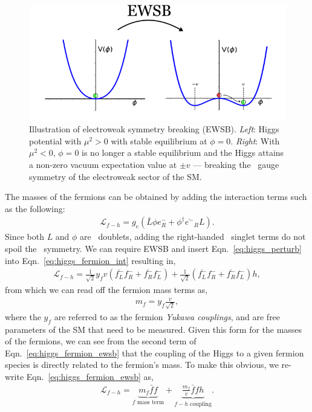 \begin{figure}[!htb]
	\begin{center}
		\includegraphics[width=\textwidth]{figures/chapter1/higgs_potential_trans}
		\caption{Illustration of electroweak symmetry breaking (EWSB).
			\textit{Left}: Higgs potential with $\mu^2>0$ with stable equilibrium at $\phi=0$.
			\textit{Right}: With $\mu^2<0$, $\phi=0$ is no longer
			a stable equilibrium and the Higgs attains a non-zero vacuum
			expectation value at $\pm v$ --- breaking the \SUewk~gauge symmetry of the electroweak
			sector of the SM.
		}
	\label{fig:higgs_ewsb}
	\end{center}
\end{figure}

The masses of the fermions can be obtained by adding the interaction terms such as the following:
\begin{align}
	\mathcal{L}_{f-h} = g_e \left( \bar{L} \phi e^-_R + \phi^{\dagger} \overline{e^-}_R L\right).
	\label{eq:higgs_fermion_int}
\end{align}
Since both $L$ and $\phi$ are \SUtwo~doublets, adding the right-handed \SUtwo~singlet terms
do not spoil the \SUtwo~symmetry. We can require EWSB and insert Eqn.~\ref{eq:higgs_perturb} 
into Eqn.~\ref{eq:higgs_fermion_int} resulting in,
\begin{align}
	\mathcal{L}_{f-h} = \frac{1}{\sqrt{2}} y_f v \left( \overline{f^-_L} f^-_R + \overline{f^-_R} f^-_L \right)
	+ \frac{1}{\sqrt{2}} \left( \overline{f^-_L}f^-_R + \overline{f^-_R} f^-_L \right) h,
	\label{eq:higgs_fermion_ewsb}
\end{align}
from which we can read off the fermion mass terms as,
\begin{align}
	m_f = y_f \frac{v}{\sqrt{2}},
	\label{eq:fermion_mass_term}
\end{align}
where the $y_f$ are referred to as the fermion \textit{Yukawa couplings}, and are free parameters
of the SM that need to be measured. Given this form for the masses of the fermions,
we can see from
the second term of Eqn.~\ref{eq:higgs_fermion_ewsb}
that the coupling of the Higgs to a given fermion species is directly related to the 
fermion's mass. To make this obvious, we re-write Eqn.~\ref{eq:higgs_fermion_ewsb} as,
\begin{align}
	\mathcal{L}_{f-h} = \underbrace{m_f \bar{f} f}_\text{$f$ mass term} + \underbrace{\frac{m_f}{v} \bar{f}f h}_\text{$f-h$ coupling}.
	\label{eq:higgs_fermion_coupling}
\end{align}




